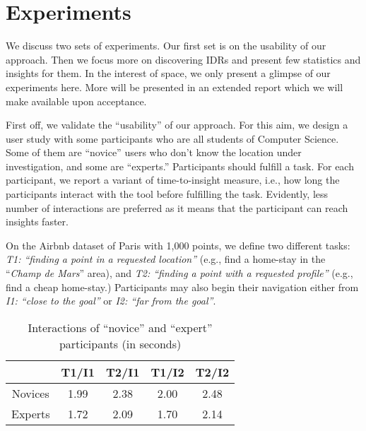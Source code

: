\documentclass[sigconf,edbt]{acmart-edbt2019}
\begin{document}
\section{Experiments}
\label{sec:experiments}

We discuss two sets of experiments. Our first set is on the usability of our approach. Then we focus more on discovering IDRs and present few statistics and insights for them. In the interest of space, we only present a glimpse of our experiments here. More will be presented in an extended report which we will make available upon acceptance. 

\vspace{2pt}
First off, we validate the ``usability'' of our approach. For this aim, we design a user study with some participants who are all students of Computer Science. Some of them are ``novice'' users who don't know the location under investigation, and some are ``experts.'' Participants should fulfill a task. For each participant, we report a variant of time-to-insight measure, i.e., how long the participants interact with the tool before fulfilling the task. Evidently, less number of interactions are preferred as it means that the participant can reach insights faster.

\vspace{2pt}
On the Airbnb dataset of Paris with 1,000 points, we define two different tasks: {\em T1: ``finding a point in a requested location''} (e.g., find a home-stay in the ``\textit{Champ de Mars}'' area), and {\em T2: ``finding a point with a requested profile''} (e.g., find a cheap home-stay.) Participants may also begin their navigation either from {\em I1: ``close to the goal''} or {\em I2: ``far from the goal''}. 


\begin{table}[h]
\centering
\caption{Interactions of ``novice'' and ``expert'' participants (in seconds)}
\label{tbl:novice}
\begin{tabular}{c|c|c|c|c|}
\cline{2-5}
                                       	& \textbf{T1/I1} 	& \textbf{T2/I1} 	& \textbf{T1/I2}	& \textbf{T2/I2}	\\ \hline
\multicolumn{1}{|c|}{Novices} 				& 1.99            	& 2.38	          	& 2.00              & 2.48              \\ \hline
\multicolumn{1}{|c|}{Experts} 				& 1.72            	& 2.09	          	& 1.70              & 2.14              \\ \hline
\end{tabular}
\end{table}
\end{document}

